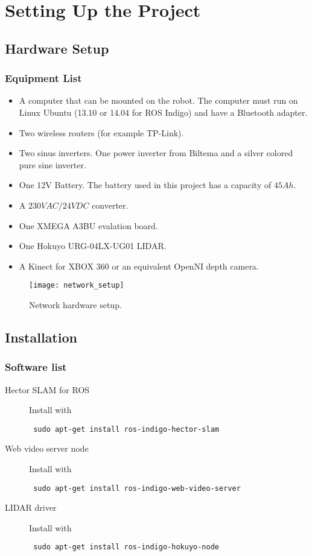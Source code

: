 \chapter{Setting Up the Project}

\section{Hardware Setup}

\subsection{Equipment List}
\begin{itemize}
	\item A computer that can be mounted on the robot. The computer must run on Linux Ubuntu (13.10 or 14.04 for ROS Indigo) and have a Bluetooth adapter.
	\item Two wireless routers (for example TP-Link).
	\item Two sinus inverters. One power inverter from Biltema and a silver colored pure sine inverter.
	\item One 12V Battery. The battery used in this project has a capacity of $45 Ah$.
	\item A $230V AC/24V DC$ converter.
	\item One XMEGA A3BU evalation board.
	\item One Hokuyo URG-04LX-UG01 LIDAR.
	\item A Kinect for XBOX 360 or an equivalent OpenNI depth camera.
\end{itemize}

\begin{figure}[h]
	\centering
	\texttt{[image: network\_setup]}
	\caption{Network hardware setup. }
	\label{fig:network_setup}
\end{figure}

\section{Installation}

\subsection{Software list}

\begin{description}
	\item[Hector SLAM for ROS] Install with \begin{verbatim} sudo apt-get install ros-indigo-hector-slam \end{verbatim}
	\item[Web video server node] Install with \begin{verbatim} sudo apt-get install ros-indigo-web-video-server \end{verbatim}
	\item[LIDAR driver] Install with \begin{verbatim} sudo apt-get install ros-indigo-hokuyo-node \end{verbatim}
\end{description}



